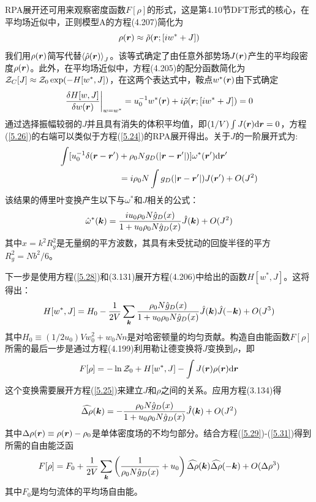 RPA展开还可用来观察密度函数$F[\rho]$的形式，这是第4.10节DFT形式的核心，在平均场近似中，正则模型A的方程(4.207)简化为
\begin{equation}\label{5.25}
\rho(\bm{r})\approx\tilde{\rho}(\bm{r};[iw^*+J])
\end{equation}
我们用$\rho(\bm{r})$简写代替$\left\langle\hat{\rho}(\bm{r})\right\rangle_J$。该等式确定了由任意外部势场$J(\bm{r})$产生的平均段密度$\rho(\bm{r})$。此外，在平均场近似中，方程(4.205)的配分函数简化为$\mathcal{Z}_C[J]\approx\mathcal{Z}_0\exp(-H[w^*,J])$，在这两个表达式中，鞍点$w^*(\bm{r})$由下式确定
\begin{equation}\label{5.26}
\frac{\delta H[w,J]}{\delta w(\bm{r})}\bigg|_{w=w^*}=u_0^{-1}w^*(\bm{r})+i\tilde{\rho}(\bm{r};[iw^*+J])=0
\end{equation}
通过选择振幅较弱的$J$并且具有消失的体积平均值，即$(1/V)\int J(\bm{r})\mathrm{d}\bm{r}=0$，方程(\ref{5.26})的右端可以类似于方程(\ref{5.24})的RPA展开得出。关于$J$的一阶展开式为:
\begin{equation}
\begin{aligned}
\int[u_0^{-1}\delta(\bm{r}-\bm{r}')&+\rho_0Ng_D(\left|\bm{r}-\bm{r}'\right|)]\omega^*(\bm{r}')\mathrm{d}\bm{r}'\\
&=i\rho_0N\int g_D(\left|\bm{r}-\bm{r}'\right|)J(\bm{r}')+O(J^2)
\end{aligned}
\end{equation}
该结果的傅里叶变换产生以下与$\omega^*$和$J$相关的公式：
\begin{equation}\label{5.28}
\hat{\omega}^*(\bm{k})=\frac{iu_0\rho_0N\hat{g}_D(x)}{1+u_0\rho_0N\hat{g}_D(x)}\hat{J}(\bm{k})+O(J^2)
\end{equation}
其中$x=k^2R_g^2$是无量纲的平方波数，其具有未受扰动的回旋半径的平方$R_g^2=Nb^2/6$。

下一步是使用方程(\ref{5.28})和(3.131)展开方程(4.206)中给出的函数$H[w^*,J]$。这将得出：
\begin{equation}\label{5.29}
H[w^*,J]=H_0-\frac{1}{2V}\sum\limits_{\bm{k}}\frac{\rho_0N\hat{g}_D(x)}{1+u_0\rho_0N\hat{g}_D(x)}\hat{J}(\bm{k})\hat{J}(-\bm{k})+O(J^3)
\end{equation}
其中$H_0\equiv(1/2u_0)Vw_0^2+w_0Nn$是对哈密顿量的均匀贡献。构造自由能函数$F[\rho]$所需的最后一步是通过方程(4.199)利用勒让德变换将$J$变换到$\rho$，即
\begin{equation}\label{5.30}
F[\rho]=-\ln\mathcal{Z}_0+H[w^*,J]-\int J(\bm{r})\rho(\bm{r})\mathrm{d}\bm{r}
\end{equation}
这个变换需要展开方程(\ref{5.25})来建立$J$和$\rho$之间的关系。应用方程(3.134)得
\begin{equation}\label{5.31}
\widehat{\Delta\rho}(\bm{k})=-\frac{\rho_0N\hat{g}_D(x)}{1+u_0\rho_0N\hat{g}_D(x)}\hat{J}(\bm{k})+O(J^2)
\end{equation}
其中$\Delta\rho(\bm{r})\equiv\rho(\bm{r})-\rho_0$是单体密度场的不均匀部分。结合方程(\ref{5.29})-(\ref{5.31})得到所需的自由能泛函
\begin{equation}\label{5.32}
F[\rho]=F_0+\frac{1}{2V}\sum\limits_{\bm{k}}\left(\frac{1}{\rho_0N\hat{g}_D(x)}+u_0\right)\widehat{\Delta\rho}(\bm{k})\widehat{\Delta\rho}(-\bm{k})+O(\Delta\rho^3)
\end{equation}
其中$F_0$是均匀流体的平均场自由能。

